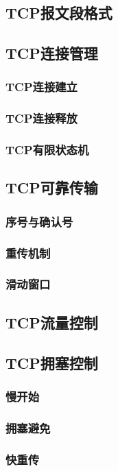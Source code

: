 \documentclass[lang=cn,newtx,10pt,scheme=chinese]{../../elegantbook}
\begin{document}
\subsection{TCP报文段格式}
\subsection{TCP连接管理}
\subsubsection{TCP连接建立}
\subsubsection{TCP连接释放}
\subsubsection{TCP有限状态机}
\subsection{TCP可靠传输}
\subsubsection{序号与确认号}
\subsubsection{重传机制}
\subsubsection{滑动窗口}
\subsection{TCP流量控制}
\subsection{TCP拥塞控制}
\subsubsection{慢开始}
\subsubsection{拥塞避免}
\subsubsection{快重传}
\end{document}
